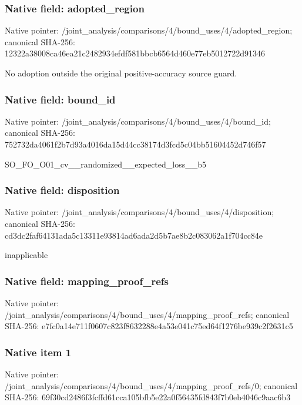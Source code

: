 \documentclass[10pt,a4paper]{article}
\begin{document}
\subsubsection{Native field: adopted\_\allowbreak{}region}
Native pointer: /joint\_\allowbreak{}analysis/comparisons/4/bound\_\allowbreak{}uses/4/adopted\_\allowbreak{}region; canonical SHA-256: 12322a38008ca46ea21c2482934efdf581bbcb6564d460e77eb5012722d91346

\begingroup\raggedright\sloppy No adoption outside the original positive-accuracy source guard.\par\endgroup

\subsubsection{Native field: bound\_\allowbreak{}id}
Native pointer: /joint\_\allowbreak{}analysis/comparisons/4/bound\_\allowbreak{}uses/4/bound\_\allowbreak{}id; canonical SHA-256: 752732da4061f2b7d93a4016da15d44cc38174d3fcd5c04bb51604452d746f57

\begingroup\raggedright\sloppy SO\_\allowbreak{}FO\_\allowbreak{}O01\_\allowbreak{}cv\_\allowbreak{}\_\allowbreak{}randomized\_\allowbreak{}\_\allowbreak{}expected\_\allowbreak{}loss\_\allowbreak{}\_\allowbreak{}b5\par\endgroup

\subsubsection{Native field: disposition}
Native pointer: /joint\_\allowbreak{}analysis/comparisons/4/bound\_\allowbreak{}uses/4/disposition; canonical SHA-256: cd3dc2faf64131ada5c13311e93814ad6ada2d5b7ae8b2c083062a1f704cc84e

\begingroup\raggedright\sloppy inapplicable\par\endgroup

\subsubsection{Native field: mapping\_\allowbreak{}proof\_\allowbreak{}refs}
Native pointer: /joint\_\allowbreak{}analysis/comparisons/4/bound\_\allowbreak{}uses/4/mapping\_\allowbreak{}proof\_\allowbreak{}refs; canonical SHA-256: e7fc0a14e711f0607c823f8632288e4a53e041c75ed64f1276be939c2f2631c5

\subsubsection{Native item 1}
Native pointer: /joint\_\allowbreak{}analysis/comparisons/4/bound\_\allowbreak{}uses/4/mapping\_\allowbreak{}proof\_\allowbreak{}refs/0; canonical SHA-256: 69f30cd2486f3fcffd61cca105bfb5e22a0f56435fd843f7b0eb4046c9aac6b3
\end{document}
